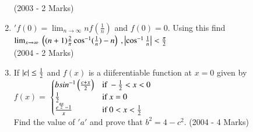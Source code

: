 \documentclass[journal,12pt,twocolumn]{IEEEtran}
\theoremstyle{remark}
\begin{document}
\begin{enumerate}
	\hfill (2003 - 2 Marks)
\item $\prime{f(0)} = \lim_{n \to \infty} nf(\frac{1}{n})$ and $f(0) = 0$. Using this find\\
	$\lim_{x \to \infty}\ \brak{(n+1)\frac{2}{\pi}\cos^{-1}(\frac{1}{n})-n}\ , \abs{\cos^{-1}\frac{1}{n}}<\frac{\pi}{2}$\\  
\hfill (2004 - 2 Marks)
\item If $\left\vert c\right\vert \leq \frac{1}{2}$ and $f(x)$ is a diiferentiable function at $x = 0$ given by\\
$f(x) = $
$\begin{cases}
	bsin^{-1} \brak{\frac{c + x}{2}} & \text{if}\ -\frac{1}{2}<x<0\\
    \frac{1}{2} & \text{if}\ x=0\\
    \frac{e^\frac{ax}{2} - 1}{x} & \text{if}\ 0<x<\frac{1}{2}
\end{cases}$\\
Find the value of $'a'$ and prove that $b^2 = 4 - c^2$.
\hfill (2004 - 4 Marks)






      
\end{enumerate}
\end{document}
